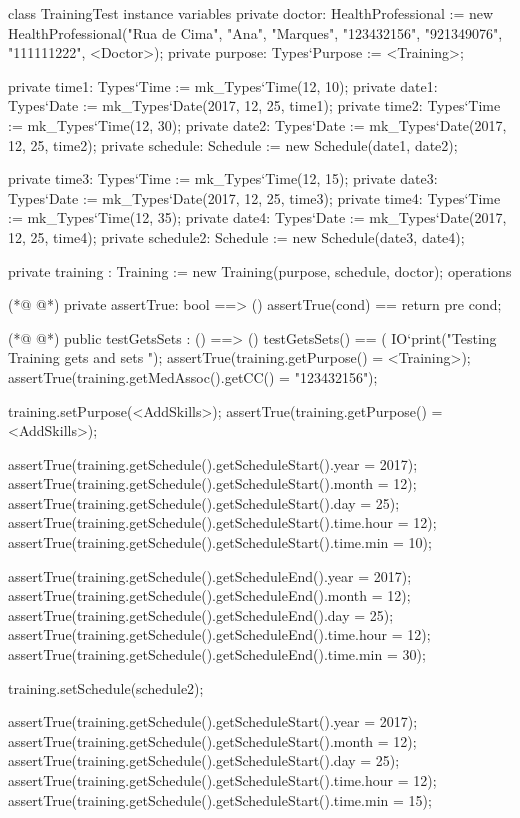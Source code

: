 \begin{vdmpp}[breaklines=true]
class TrainingTest
instance variables
 private doctor: HealthProfessional := new HealthProfessional("Rua de Cima", "Ana", "Marques", "123432156", "921349076", "111111222", <Doctor>);
  private purpose: Types`Purpose := <Training>;
  
 private time1: Types`Time := mk_Types`Time(12, 10);
 private date1: Types`Date := mk_Types`Date(2017, 12, 25, time1);
 private time2: Types`Time := mk_Types`Time(12, 30);
 private date2: Types`Date := mk_Types`Date(2017, 12, 25, time2);
 private schedule: Schedule := new Schedule(date1, date2);
 
 private time3: Types`Time := mk_Types`Time(12, 15);
 private date3: Types`Date := mk_Types`Date(2017, 12, 25, time3);
 private time4: Types`Time := mk_Types`Time(12, 35);
 private date4: Types`Date := mk_Types`Date(2017, 12, 25, time4);
 private schedule2: Schedule := new Schedule(date3, date4);
 
 private training : Training := new Training(purpose, schedule, doctor);
operations
 
(*@
\label{assertTrue:21}
@*)
 private assertTrue: bool ==> ()
  assertTrue(cond) == return
 pre cond;
 
(*@
\label{testGetsSets:25}
@*)
 public testGetsSets : () ==> ()
  testGetsSets() == (
   IO`print("\n Testing Training gets and sets \n");
   assertTrue(training.getPurpose() = <Training>);
   assertTrue(training.getMedAssoc().getCC() = "123432156");
   
   training.setPurpose(<AddSkills>);
   assertTrue(training.getPurpose() = <AddSkills>);
   
   assertTrue(training.getSchedule().getScheduleStart().year = 2017);
   assertTrue(training.getSchedule().getScheduleStart().month = 12);
   assertTrue(training.getSchedule().getScheduleStart().day = 25);
   assertTrue(training.getSchedule().getScheduleStart().time.hour = 12);
   assertTrue(training.getSchedule().getScheduleStart().time.min = 10);
   
   assertTrue(training.getSchedule().getScheduleEnd().year = 2017);
   assertTrue(training.getSchedule().getScheduleEnd().month = 12);
   assertTrue(training.getSchedule().getScheduleEnd().day = 25);
   assertTrue(training.getSchedule().getScheduleEnd().time.hour = 12);
   assertTrue(training.getSchedule().getScheduleEnd().time.min = 30);
   
   training.setSchedule(schedule2);
   
   assertTrue(training.getSchedule().getScheduleStart().year = 2017);
   assertTrue(training.getSchedule().getScheduleStart().month = 12);
   assertTrue(training.getSchedule().getScheduleStart().day = 25);
   assertTrue(training.getSchedule().getScheduleStart().time.hour = 12);
   assertTrue(training.getSchedule().getScheduleStart().time.min = 15);
   

\end{vdmpp}
